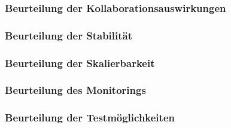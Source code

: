 \documentclass[11pt]{article}
\begin{document}







 




\subsubsection{Beurteilung der Kollaborationsauswirkungen}
\subsubsection{Beurteilung der Stabilität}
\subsubsection{Beurteilung der Skalierbarkeit} 
\subsubsection{Beurteilung des Monitorings}
\subsubsection{Beurteilung der Testmöglichkeiten} 
\end{document}
